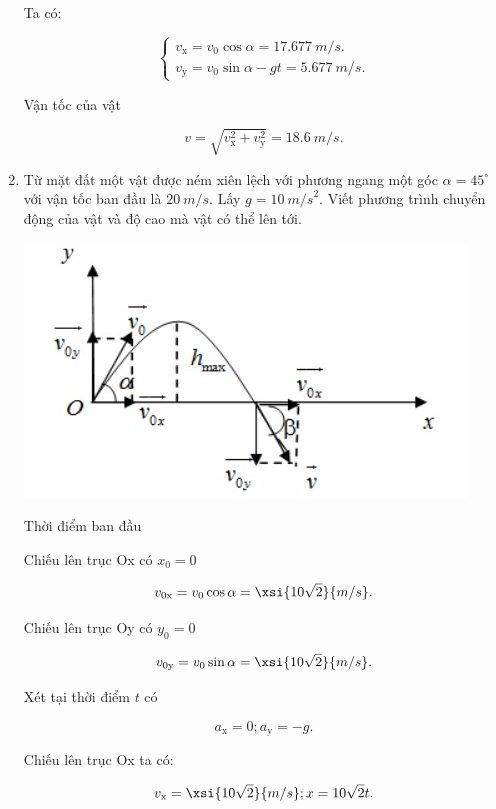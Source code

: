 \begin{enumerate}[label=\bfseries Câu \arabic*:]
		\hideall
		{	
			Ta có:
			
			$$\begin{cases}
				v_\text{x} = v_0 \cos \alpha = \SI{17,677}{m/s}.\\
				v_\text{y} = v_0 \sin \alpha - gt = \SI{5,677}{m/s}.
			\end{cases}$$
		
			Vận tốc của vật
			
			$$v = \sqrt{v^2_\text{x} + v^2_\text{y}} = \SI{18,6}{m/s}.$$
			
		}
			\item {}
		
		
		
		{Từ mặt đất một vật được ném xiên lệch với phương ngang một góc $\alpha = 45^\circ$ với vận tốc ban đầu là $\SI{20}{m/s}$. Lấy $g=\SI{10}{m/s}^2$. Viết phương trình chuyển động của vật và độ cao mà vật có thể lên tới.
		}
		
		\hideall
		{	
			
			\begin{center}
				\includegraphics[scale=1.2]{../figs/VN10-2021-PH-TP014-2.jpg}
			\end{center}
			
		Thời điểm ban đầu
		
		Chiếu lên trục Ox có $x_0 = 0$
		
		$$v_{0\text{x}} = v_0 \cos \alpha = \xsi{10\sqrt 2}{m/s}.$$
		
		Chiếu lên trục Oy có $y_0 = 0$
		
		$$v_{0\text{y}} = v_0 \sin \alpha = \xsi{10\sqrt 2}{m/s}.$$	
		
		Xét tại thời điểm $t$ có
		
		$$a_\text{x} = 0; a_\text{y} = -g.$$
		
		Chiếu lên trục Ox ta có:
		
		$$v_\text{x} = \xsi{10\sqrt 2}{m/s}; x = 10\sqrt 2 t.$$
		
}
\end{enumerate}
